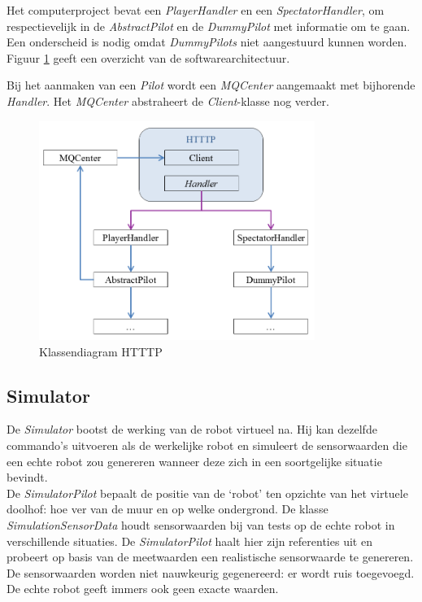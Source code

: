 \documentclass[tt2]{penoverslag}
\begin{document}
Het computerproject bevat een \textit{PlayerHandler} en een \textit{SpectatorHandler}, om respectievelijk in de \textit{AbstractPilot} en de \textit{DummyPilot} met informatie om te gaan. Een onderscheid is nodig omdat \textit{DummyPilots} niet aangestuurd kunnen worden. Figuur \ref{fig:KlasHTTTP} geeft een overzicht van de softwarearchitectuur.

Bij het aanmaken van een \textit{Pilot} wordt een \textit{MQCenter} aangemaakt met bijhorende \textit{Handler}. Het \textit{MQCenter} abstraheert de \textit{Client}-klasse nog verder.

\begin{figure}[h]
\centering
	\includegraphics[width=0.8\textwidth]{KlasHTTTP}
\caption{Klassendiagram HTTTP}
\label{fig:KlasHTTTP}
\end{figure}


\subsection{Simulator}
\label{ssec:Sim}
De \textit{Simulator} bootst de werking van de robot virtueel na. Hij kan dezelfde commando's uitvoeren als de werkelijke robot en simuleert de sensorwaarden die een echte robot zou genereren wanneer deze zich in een soortgelijke situatie bevindt.\\

De \textit{SimulatorPilot} bepaalt de positie van de `robot' ten opzichte van het virtuele doolhof: hoe ver van de muur en op welke ondergrond. De klasse \textit{SimulationSensorData} houdt sensorwaarden bij van tests op de echte robot in verschillende situaties. De \textit{SimulatorPilot} haalt hier zijn referenties uit en probeert op basis van de meetwaarden een realistische sensorwaarde te genereren. De sensorwaarden worden niet nauwkeurig gegenereerd: er wordt ruis toegevoegd. De echte robot geeft immers ook geen exacte waarden.\\
\end{document}
